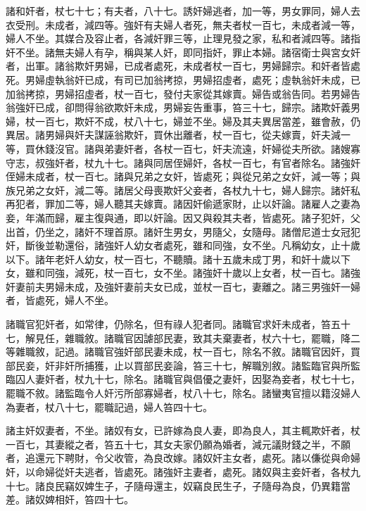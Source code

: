 \begin{pinyinscope}
 諸和奸者，杖七十七；有夫者，八十七。誘奸婦逃者，加一等，男女罪同，婦人去衣受刑。未成者，減四等。強奸有夫婦人者死，無夫者杖一百七，未成者減一等，婦人不坐。其媒合及容止者，各減奸罪三等，止理見發之家，私和者減四等。諸指奸不坐。諸無夫婦人有孕，稱與某人奸，即同指奸，罪止本婦。諸宿衛士與宮女奸者，出軍。諸翁欺奸男婦，已成者處死，未成者杖一百七，男婦歸宗。和奸者皆處死。男婦虛執翁奸已成，有司已加翁拷掠，男婦招虛者，處死；虛執翁奸未成，已加翁拷掠，男婦招虛者，杖一百七，發付夫家從其嫁賣。婦告或翁告同。若男婦告翁強奸已成，卻問得翁欲欺奸未成，男婦妄告重事，笞三十七，歸宗。諸欺奸義男婦，杖一百七，欺奸不成，杖八十七，婦並不坐。婦及其夫異居當差，雖會赦，仍異居。諸男婦與奸夫謀誣翁欺奸，買休出離者，杖一百七，從夫嫁賣，奸夫減一等，買休錢沒官。諸與弟妻奸者，各杖一百七，奸夫流遠，奸婦從夫所欲。諸嫂寡守志，叔強奸者，杖九十七。諸與同居侄婦奸，各杖一百七，有官者除名。諸強奸侄婦未成者，杖一百七。諸與兄弟之女奸，皆處死；與從兄弟之女奸，減一等；與族兄弟之女奸，減二等。諸居父母喪欺奸父妾者，各杖九十七，婦人歸宗。諸奸私再犯者，罪加二等，婦人聽其夫嫁賣。諸因奸偷遞家財，止以奸論。諸雇人之妻為妾，年滿而歸，雇主復與通，即以奸論。因又與殺其夫者，皆處死。諸子犯奸，父出首，仍坐之，諸奸不理首原。諸奸生男女，男隨父，女隨母。諸僧尼道士女冠犯奸，斷後並勒還俗，諸強奸人幼女者處死，雖和同強，女不坐。凡稱幼女，止十歲以下。諸年老奸人幼女，杖一百七，不聽贖。諸十五歲未成丁男，和奸十歲以下女，雖和同強，減死，杖一百七，女不坐。諸強奸十歲以上女者，杖一百七。諸強奸妻前夫男婦未成，及強奸妻前夫女已成，並杖一百七，妻離之。諸三男強奸一婦者，皆處死，婦人不坐。



 諸職官犯奸者，如常律，仍除名，但有祿人犯者同。諸職官求奸未成者，笞五十七，解見任，雜職敘。諸職官因謔部民妻，致其夫棄妻者，杖六十七，罷職，降二等雜職敘，記過。諸職官強奸部民妻未成，杖一百七，除名不敘。諸職官因奸，買部民妾，奸非奸所捕獲，止以買部民妾論，笞三十七，解職別敘。諸監臨官與所監臨囚人妻奸者，杖九十七，除名。諸職官與倡優之妻奸，因娶為妾者，杖七十七，罷職不敘。諸監臨令人奸污所部寡婦者，杖八十七，除名。諸蠻夷官擅以籍沒婦人為妻者，杖八十七，罷職記過，婦人笞四十七。



 諸主奸奴妻者，不坐。諸奴有女，已許嫁為良人妻，即為良人，其主輒欺奸者，杖一百七，其妻縱之者，笞五十七，其女夫家仍願為婚者，減元議財錢之半，不願者，追還元下聘財，令父收管，為良改嫁。諸奴奸主女者，處死。諸以傔從與命婦奸，以命婦從奸夫逃者，皆處死。諸強奸主妻者，處死。諸奴與主妾奸者，各杖九十七。諸良民竊奴婢生子，子隨母還主，奴竊良民生子，子隨母為良，仍異籍當差。諸奴婢相奸，笞四十七。




\end{pinyinscope}
